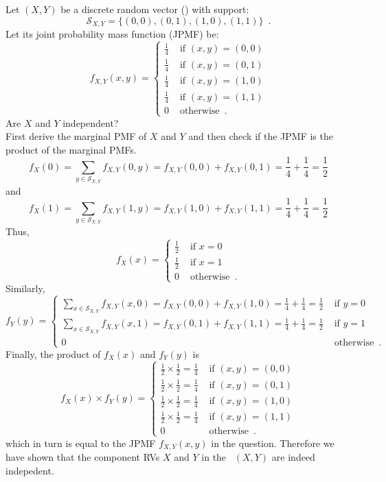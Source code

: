 \begin{ExerciseList}
\Exercise
Let $(X,Y)$ be a discrete random vector (\rv) with support:
\[
\mathcal{S}_{X,Y} = \{(0,0),(0,1),(1,0),(1,1)\} \enspace .
\]
Let its joint probability mass function (JPMF) be:
\[
f_{X,Y}(x,y) = 
\begin{cases}
\frac{1}{4} & \text{ if } (x,y)=(0,0)\\
\frac{1}{4} & \text{ if } (x,y)=(0,1)\\
\frac{1}{4} & \text{ if } (x,y)=(1,0)\\
\frac{1}{4} & \text{ if } (x,y)=(1,1)\\
0 & \text{ otherwise} \enspace .
\end{cases}
\]
Are $X$ and $Y$ independent? 
\Answer
~\\
First derive the marginal PMF of $X$ and $Y$ and then check if the JPMF is the product of the marginal PMFs.
\[
f_X(0) = \sum_{y \in \mathcal{S}_{X,Y}} f_{X,Y}(0,y) = f_{X,Y}(0,0) + f_{X,Y}(0,1) = \frac{1}{4}+\frac{1}{4}=\frac{1}{2}
\]
and
\[
f_X(1) = \sum_{y \in \mathcal{S}_{X,Y}} f_{X,Y}(1,y) = f_{X,Y}(1,0) + f_{X,Y}(1,1) = \frac{1}{4}+\frac{1}{4}=\frac{1}{2}
\]
Thus,
\[
f_{X}(x) = 
\begin{cases}
\frac{1}{2} & \text{ if } x = 0\\
\frac{1}{2} & \text{ if } x = 1\\
0 & \text{ otherwise} \enspace .
\end{cases}
\]
Similarly,
\[
f_{Y}(y) = 
\begin{cases}
\sum_{x \in \mathcal{S}_{X,Y}} f_{X,Y}(x,0)=f_{X,Y}(0,0) + f_{X,Y}(1,0) = \frac{1}{4}+\frac{1}{4}=\frac{1}{2} & \text{ if } y = 0\\
\sum_{x \in \mathcal{S}_{X,Y}} f_{X,Y}(x,1)=f_{X,Y}(0,1) + f_{X,Y}(1,1) = \frac{1}{4}+\frac{1}{4}=\frac{1}{2} & \text{ if } y = 1\\
0 & \text{ otherwise} \enspace .
\end{cases}
\]
Finally, the product of $f_X(x)$ and $f_Y(y)$ is
\[
f_{X}(x) \times f_{Y}(y) = 
\begin{cases}
\frac{1}{2} \times \frac{1}{2}=\frac{1}{4} & \text{ if } (x,y)=(0,0)\\
\frac{1}{2} \times \frac{1}{2}=\frac{1}{4} & \text{ if } (x,y)=(0,1)\\
\frac{1}{2} \times \frac{1}{2}=\frac{1}{4} & \text{ if } (x,y)=(1,0)\\
\frac{1}{2} \times \frac{1}{2}=\frac{1}{4} & \text{ if } (x,y)=(1,1)\\
0 & \text{ otherwise} \enspace .
\end{cases}
\]
which in turn is equal to the JPMF $f_{X,Y}(x,y)$ in the question.  Therefore we have shown that the component RVs $X$ and $Y$ in the \rv~$(X,Y)$ are indeed indepedent.


\end{ExerciseList}
